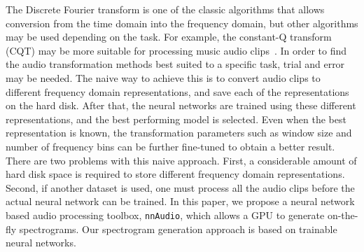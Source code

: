 \documentclass{ieeeaccess}
\newcommand{\nbh}[1]{\texttt{#1}}
\begin{document}
The Discrete Fourier transform is one of the classic algorithms that allows conversion from the time domain into the frequency domain, but other algorithms may be used depending on the task. For example, the constant-Q transform (CQT) may be more suitable for processing music audio clips~\cite{brown1991calculation}. In order to find the audio transformation methods best suited to a specific task, trial and error may be needed. The naive way to achieve this is to convert audio clips to different frequency domain representations, and save each of the representations on the hard disk. After that, the neural networks are trained using these different representations, and the best performing model is selected. Even when the best representation is known, the transformation parameters such as window size and number of frequency bins can be further fine-tuned to obtain a better result. There are two problems with this naive approach. First, a considerable amount of hard disk space is required to store different frequency domain representations. Second, if another dataset is used, one must process all the audio clips before the actual neural network can be trained. In this paper, we propose a neural network based audio processing toolbox, \nbh{nnAudio}, which allows a GPU to generate on-the-fly spectrograms. Our spectrogram generation approach is based on trainable neural networks.
\end{document}
